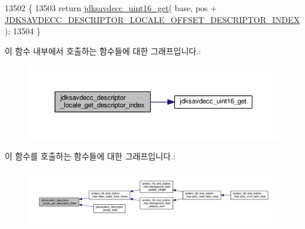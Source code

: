 \begin{DoxyCode}
13502 \{
13503     \textcolor{keywordflow}{return} \hyperlink{group__endian_ga3fbbbc20be954aa61e039872965b0dc9}{jdksavdecc\_uint16\_get}( base, pos + 
      \hyperlink{group__descriptor__locale_ga86c98fff1b622eb3cde98745a0edad51}{JDKSAVDECC\_DESCRIPTOR\_LOCALE\_OFFSET\_DESCRIPTOR\_INDEX} );
13504 \}
\end{DoxyCode}


이 함수 내부에서 호출하는 함수들에 대한 그래프입니다.\+:
\nopagebreak
\begin{figure}[H]
\begin{center}
\leavevmode
\includegraphics[width=350pt]{group__descriptor__locale_gacc9a6ca9fcae307381f586bbd4dae5ae_cgraph}
\end{center}
\end{figure}




이 함수를 호출하는 함수들에 대한 그래프입니다.\+:
\nopagebreak
\begin{figure}[H]
\begin{center}
\leavevmode
\includegraphics[width=350pt]{group__descriptor__locale_gacc9a6ca9fcae307381f586bbd4dae5ae_icgraph}
\end{center}
\end{figure}


